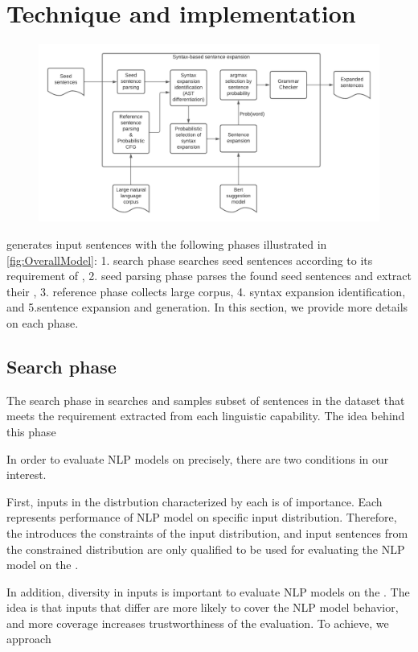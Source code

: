\section{Technique and implementation}

\begin{figure}
  \centering
  \includegraphics[scale=0.5]{figs/overall.pdf}
  \vspace{-5pt}
  \caption{\OverallModelFigCaption}
  \vspace{-10pt}
\end{figure}

\Model generates input sentences with the following phases illustrated
in \ref{fig:OverallModel}: 1. search phase searches seed sentences according to
its requirement of \lc, 2. seed parsing phase parses the found seed
sentences and extract their \cfg, 3. reference phase collects large
corpus, 4. syntax expansion identification, and 5.sentence expansion
and generation. In this section, we provide more details on each phase.

\subsection{Search phase}
The search phase in \Model searches and samples subset of sentences in
the dataset that meets the requirement extracted from each linguistic
capability. The idea behind this phase 

In order to evaluate NLP models on \lc precisely, there
are two conditions in our interest.

First, inputs in the distrbution
characterized by each \lc is of importance. Each \lc represents
performance of NLP model on specific input distribution. Therefore,
the \lc introduces the constraints of the input distribution, and
input sentences from the constrained distribution are only qualified
to be used for evaluating the NLP model on the \lc.

In addition,
diversity in inputs is important to evaluate NLP models on the
\lc. The idea is that inputs that differ are more likely to cover the
NLP model behavior, and more coverage increases trustworthiness of the
evaluation. To achieve, we approach

